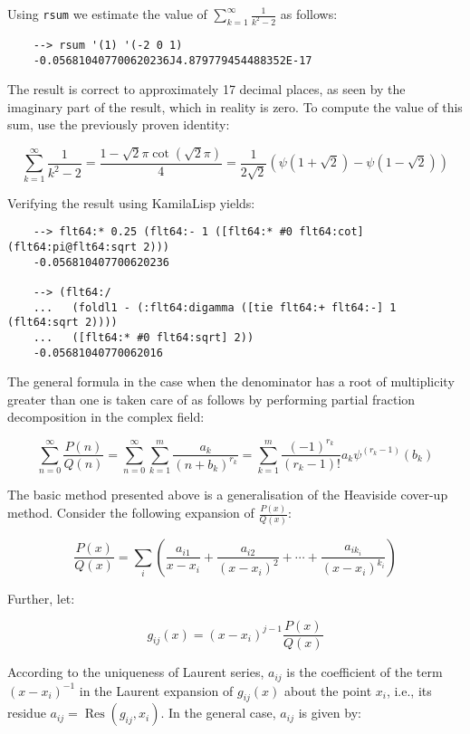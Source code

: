 Using \verb|rsum| we estimate the value of $\displaystyle \sum_{k=1}^{\infty} \frac{1}{k^2-2}$ as follows:

\begin{Verbatim}
    --> rsum '(1) '(-2 0 1)
    -0.056810407700620236J4.879779454488352E-17
\end{Verbatim}

The result is correct to approximately 17 decimal places, as seen by the imaginary part of the result, which in reality is zero. To compute the value of this sum, use the previously proven identity:

$$\sum_{k=1}^\infty \frac{1}{k^2 - 2} = \frac{1-\sqrt{2}\pi\cot(\sqrt{2}\pi)}{4} = \frac{1}{2\sqrt{2}}\left(\psi\left(1+\sqrt{2}\right)-\psi\left(1-\sqrt{2}\right)\right)$$

Verifying the result using KamilaLisp yields:

\begin{Verbatim}
    --> flt64:* 0.25 (flt64:- 1 ([flt64:* #0 flt64:cot] (flt64:pi@flt64:sqrt 2)))
    -0.056810407700620236

    --> (flt64:/
    ...   (foldl1 - (:flt64:digamma ([tie flt64:+ flt64:-] 1 (flt64:sqrt 2))))
    ...   ([flt64:* #0 flt64:sqrt] 2))
    -0.05681040770062016
\end{Verbatim}

The general formula in the case when the denominator has a root of multiplicity greater than one is taken care of as follows by performing partial fraction decomposition in the complex field:

$$
\sum_{n=0}^{\infty }\frac{P(n)}{Q(n)}=\sum _{n=0}^{\infty }\sum
_{k=1}^{m}{\frac {a_{k}}{(n+b_{k})^{r_{k}}}}=\sum _{k=1}^{m}{\frac
{(-1)^{r_{k}}}{(r_{k}-1)!}}a_{k}\psi ^{(r_{k}-1)}(b_{k})
$$

The basic method presented above is a generalisation of the Heaviside cover-up method. Consider the following expansion of $\frac{P(x)}{Q(x)}$:

$$
\frac{P(x)}{Q(x)}=\sum _{i}\left({\frac {a_{i1}}{x-x_{i}}}+{\frac {a_{i2}}{(x-x_{i})^{2}}}+\cdots +{\frac {a_{ik_{i}}}{(x-x_{i})^{k_{i}}}}\right)
$$

Further, let:

$$
g_{ij}(x)=(x-x_{i})^{j-1}\frac{P(x)}{Q(x)}
$$

According to the uniqueness of Laurent series, $a_{ij}$ is the coefficient of the term $(x − x_i)^{−1}$ in the Laurent expansion of $g_{ij}(x)$ about the point $x_i$, i.e., its residue ${\displaystyle a_{ij}=\operatorname {Res} (g_{ij},x_{i})}$. In the general case, $a_{ij}$ is given by:


